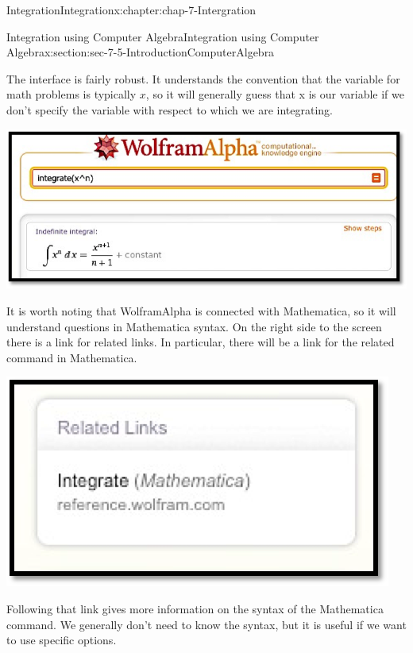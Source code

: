 \documentclass[oneside,10pt,]{book}
\numberwithin{equation}{section}
\begin{document}
\begin{chapterptx}{Integration}{}{Integration}{}{}{x:chapter:chap-7-Intergration}
\begin{sectionptx}{Integration using Computer Algebra}{}{Integration using Computer Algebra}{}{}{x:section:sec-7-5-IntroductionComputerAlgebra}
\par
The interface is fairly robust.  It understands the convention that the variable for math problems is typically \(x\), so it will generally guess that x is our variable if we don't specify the variable with respect to which we are integrating.%
\begin{sidebyside}{1}{0.15}{0.15}{0}%
\begin{sbspanel}{0.7}%
\includegraphics[width=\linewidth]{images/sec7-5-4.png}
\end{sbspanel}%
\end{sidebyside}%
\par
It is worth noting that Wolfram\textbar{}Alpha is connected with Mathematica, so it will understand questions in Mathematica syntax.  On the right side to the screen there is a link for related links.  In particular, there will be a link for the related command in Mathematica.%
\begin{sidebyside}{1}{0.25}{0.25}{0}%
\begin{sbspanel}{0.5}%
\includegraphics[width=\linewidth]{images/sec7-5-5.png}
\end{sbspanel}%
\end{sidebyside}%
\par
Following that link gives more information on the syntax of the Mathematica command.  We generally don't need to know the syntax, but it is useful if we want to use specific options.%

\end{sectionptx}
\end{chapterptx}
\end{document}
